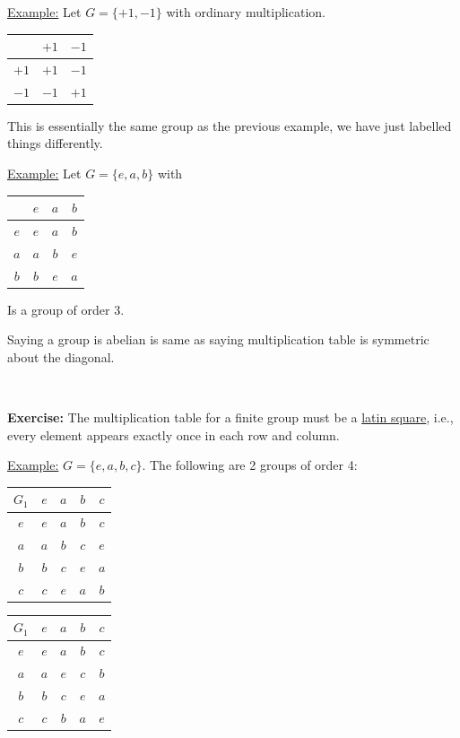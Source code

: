 \documentclass{article}
\theoremstyle{definition}
\begin{document}
\noindent\underline{Example:} Let $G=\{+1,-1\}$ with ordinary multiplication.
\begin{table}[H]
    \centering
    \begin{tabular}{c|cc}
        & $+1$ & $-1$\\
        \hline
        $+1$ & $+1$ & $-1$\\
        $-1$ & $-1$ & $+1$
    \end{tabular}
\end{table}
This is essentially the same group as the previous example, we have just labelled things differently.

\noindent\underline{Example:} Let $G=\{e,a,b\}$ with
\begin{table}[H]
    \centering
    \begin{tabular}{c|ccc}
        & $e$ & $a$ & $b$\\
        \hline
        $e$ & $e$ & $a$ & $b$\\
        $a$ & $a$ & $b$ & $e$\\
        $b$ & $b$ & $e$ & $a$
    \end{tabular}
\end{table}
Is a group of order $3$.

Saying a group is abelian is same as saying multiplication table is symmetric about the diagonal.

\ 

\noindent\textbf{Exercise:} The multiplication table for a finite group must be a \underline{latin square}, i.e., every element appears exactly once in each row and column.

\noindent\underline{Example:} $G=\{e,a,b,c\}$. The following are 2 groups of order 4:
\begin{table}[H]
    \centering
    \begin{tabular}{c|cccc}
        $G_1$ & $e$ & $a$ & $b$ & $c$\\
        \hline
        $e$ & $e$ & $a$ & $b$ & $c$\\
        $a$ & $a$ & $b$ & $c$ & $e$\\
        $b$ & $b$ & $c$ & $e$ & $a$\\
        $c$ & $c$ & $e$ & $a$ & $b$
    \end{tabular}
\end{table}

\begin{table}[H]
    \centering
    \begin{tabular}{c|cccc}
        $G_1$ & $e$ & $a$ & $b$ & $c$\\
        \hline
        $e$ & $e$ & $a$ & $b$ & $c$\\
        $a$ & $a$ & $e$ & $c$ & $b$\\
        $b$ & $b$ & $c$ & $e$ & $a$\\
        $c$ & $c$ & $b$ & $a$ & $e$
    \end{tabular}
\end{table}
\end{document}
